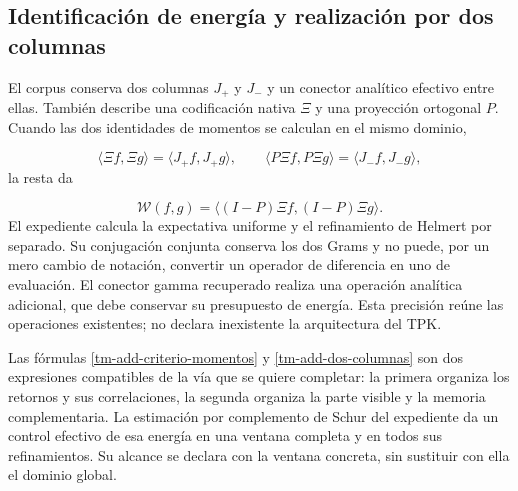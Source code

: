 \subsection{Identificación de energía y realización por dos columnas}
\label{tm-add-c6}
El corpus conserva dos columnas \(J_+\) y \(J_-\) y un conector analítico efectivo entre ellas. También describe una codificación nativa \(\Xi\) y una proyección ortogonal \(P\). Cuando las dos identidades de momentos se calculan en el mismo dominio,

\[
\langle\Xi f,\Xi g\rangle=\langle J_+f,J_+g\rangle,
\qquad
\langle P\Xi f,P\Xi g\rangle=\langle J_-f,J_-g\rangle,
\]
la resta da

\begin{equation}
\mathscr W(f,g)=\langle(I-P)\Xi f,(I-P)\Xi g\rangle.
\label{tm-add-dos-columnas}
\end{equation}
El expediente calcula la expectativa uniforme y el refinamiento de Helmert por separado. Su conjugación conjunta conserva los dos Grams y no puede, por un mero cambio de notación, convertir un operador de diferencia en uno de evaluación. El conector gamma recuperado realiza una operación analítica adicional, que debe conservar su presupuesto de energía. Esta precisión reúne las operaciones existentes; no declara inexistente la arquitectura del TPK.

Las fórmulas \eqref{tm-add-criterio-momentos} y \eqref{tm-add-dos-columnas} son dos expresiones compatibles de la vía que se quiere completar: la primera organiza los retornos y sus correlaciones, la segunda organiza la parte visible y la memoria complementaria. La estimación por complemento de Schur del expediente da un control efectivo de esa energía en una ventana completa y en todos sus refinamientos. Su alcance se declara con la ventana concreta, sin sustituir con ella el dominio global.


% 
% 

